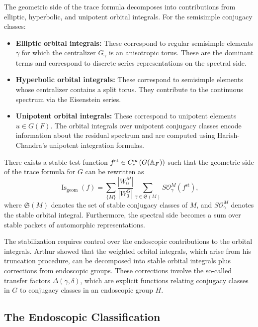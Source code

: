 The geometric side of the trace formula decomposes into contributions from elliptic, hyperbolic, and unipotent orbital integrals. For the semisimple conjugacy classes:

\begin{itemize}
    \item \textbf{Elliptic orbital integrals:} These correspond to regular semisimple elements $\gamma$ for which the centralizer $G_\gamma$ is an anisotropic torus. These are the dominant terms and correspond to discrete series representations on the spectral side.
    \item \textbf{Hyperbolic orbital integrals:} These correspond to semisimple elements whose centralizer contains a split torus. They contribute to the continuous spectrum via the Eisenstein series.
    \item \textbf{Unipotent orbital integrals:} These correspond to unipotent elements $u \in G(F)$. The orbital integrals over unipotent conjugacy classes encode information about the residual spectrum and are computed using Harish-Chandra's unipotent integration formulas.
\end{itemize}

\begin{theorem}
There exists a stable test function $f^{\mathrm{st}} \in C_c^\infty(G(\mathbb{A}_F))$ such that the geometric side of the trace formula for $G$ can be rewritten as
\[
\operatorname{Is}_{\mathrm{geom}}(f) = \sum_{\{M\}} \frac{|W_0^M|}{|W_0^G|} \sum_{\gamma \in \mathfrak{S}(M)} S\mathcal{O}_\gamma^M(f^{\mathrm{st}}),
\]
where $\mathfrak{S}(M)$ denotes the set of stable conjugacy classes of $M$, and $S\mathcal{O}_\gamma^M$ denotes the stable orbital integral. Furthermore, the spectral side becomes a sum over stable packets of automorphic representations.
\end{theorem}

\begin{remark}
The stabilization requires control over the endoscopic contributions to the orbital integrals. Arthur showed that the weighted orbital integrals, which arise from his truncation procedure, can be decomposed into stable orbital integrals plus corrections from endoscopic groups. These corrections involve the so-called transfer factors $\Delta(\gamma, \delta)$, which are explicit functions relating conjugacy classes in $G$ to conjugacy classes in an endoscopic group $H$.
\end{remark}

\subsection{The Endoscopic Classification}

